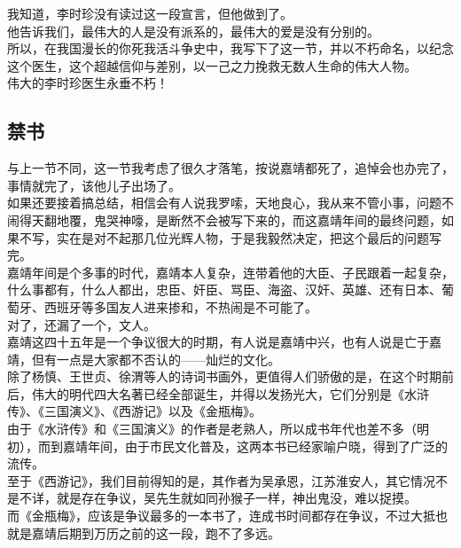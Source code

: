 \begin{multicols}{\theparacolNo}
我知道，李时珍没有读过这一段宣言，但他做到了。\\

他告诉我们，最伟大的人是没有派系的，最伟大的爱是没有分别的。\\

所以，在我国漫长的你死我活斗争史中，我写下了这一节，并以不朽命名，以纪念这个医生，这个超越信仰与差别，以一己之力挽救无数人生命的伟大人物。\\

伟大的李时珍医生永垂不朽！\\

\subsection{禁书}
与上一节不同，这一节我考虑了很久才落笔，按说嘉靖都死了，追悼会也办完了，事情就完了，该他儿子出场了。\\

如果还要接着搞总结，相信会有人说我罗嗦，天地良心，我从来不管小事，问题不闹得天翻地覆，鬼哭神嚎，是断然不会被写下来的，而这嘉靖年间的最终问题，如果不写，实在是对不起那几位光辉人物，于是我毅然决定，把这个最后的问题写完。\\

嘉靖年间是个多事的时代，嘉靖本人复杂，连带着他的大臣、子民跟着一起复杂，什么事都有，什么人都出，忠臣、奸臣、骂臣、海盗、汉奸、英雄、还有日本、葡萄牙、西班牙等多国友人进来掺和，不热闹是不可能了。\\

对了，还漏了一个，文人。\\

嘉靖这四十五年是一个争议很大的时期，有人说是嘉靖中兴，也有人说是亡于嘉靖，但有一点是大家都不否认的——灿烂的文化。\\

除了杨慎、王世贞、徐渭等人的诗词书画外，更值得人们骄傲的是，在这个时期前后，伟大的明代四大名著已经全部诞生，并得以发扬光大，它们分别是《水浒传》、《三国演义》、《西游记》以及《金瓶梅》。\\

由于《水浒传》和《三国演义》的作者是老熟人，所以成书年代也差不多（明初），而到嘉靖年间，由于市民文化普及，这两本书已经家喻户晓，得到了广泛的流传。\\

至于《西游记》，我们目前得知的是，其作者为吴承恩，江苏淮安人，其它情况不是不详，就是存在争议，吴先生就如同孙猴子一样，神出鬼没，难以捉摸。\\

而《金瓶梅》，应该是争议最多的一本书了，连成书时间都存在争议，不过大抵也就是嘉靖后期到万历之前的这一段，跑不了多远。\\


\end{multicols}
